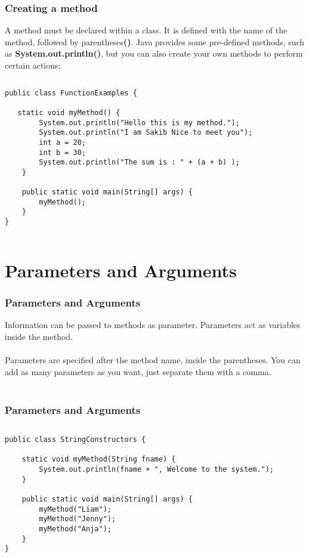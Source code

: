 \documentclass{beamer}
\begin{document}
\begin{frame}[fragile]
\frametitle{Creating a method}
A method must be declared within a class. It is defined with the name of the method, followed by parentheses\textbf{()}. Java provides some pre-defined methods, such as \textbf{System.out.println()}, but you can also create your own methods to perform certain actions:
\begin{columns}[T]
\begin{column}{\textwidth}
\begin{lstlisting}
public class FunctionExamples {

   static void myMethod() {
        System.out.println("Hello this is my method.");
        System.out.println("I am Sakib Nice to meet you");
        int a = 20;
        int b = 30;
        System.out.println("The sum is : " + (a + b) );
    }

    public static void main(String[] args) {
        myMethod();
    }
}
\end{lstlisting}
\end{column}
\end{columns}
\end{frame}


\section{Parameters and Arguments}

\begin{frame}
\frametitle{Parameters and Arguments}
Information can be passed to methods as parameter. Parameters act as variables inside the method.\\~\\
Parameters are specified after the method name, inside the parentheses. You can add as many parameters as you want, just separate them with a comma.\\~\\

\end{frame}

\begin{frame}[fragile]
\frametitle{Parameters and Arguments}
\begin{columns}[T]
\begin{column}{\textwidth}
\begin{lstlisting}
public class StringConstructors {

    static void myMethod(String fname) {
        System.out.println(fname + ", Welcome to the system.");
    }

    public static void main(String[] args) {
        myMethod("Liam");
        myMethod("Jenny");
        myMethod("Anja");
    }
}
\end{lstlisting}
\end{column}
\end{columns}

\end{frame}
\end{document}
